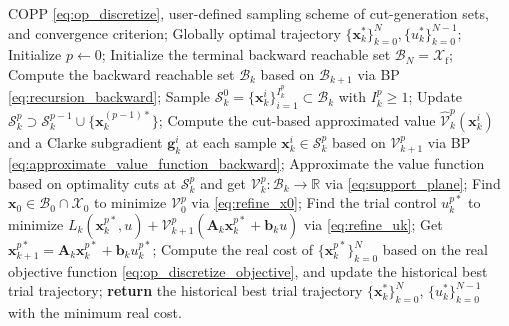 \documentclass[journal]{IEEEtran}
\theoremstyle{definition}
\theoremstyle{definition}
\newcommand\R{{\mathbb{R}}}
\renewcommand\vector[1]{\boldsymbol{#1}}
\newcommand\vb{{\vector{b}}}
\newcommand\vg{{\vector{g}}}
\newcommand\vx{{\vector{x}}}
\newcommand\vA{{\vector{A}}}
\begin{document}
\begin{algorithm}[!t]
    \caption{RDDP for COPP.}
    \label{alg:ardp_copp}
    \begin{algorithmic}[1]
        \REQUIRE COPP \eqref{eq:op_discretize}, user-defined sampling scheme of  cut-generation sets, and convergence criterion;
        \ENSURE Globally optimal trajectory $\{\vx_k^*\}_{k=0}^{N}, \{u_k^*\}_{k=0}^{N-1}$;
        \STATE Initialize $p\leftarrow 0$;
        \STATE Initialize the terminal backward reachable set $\mathcal{B}_N=\mathcal{X}_\text{f}$;
        \REPEAT
                    \STATE Compute the backward reachable set $\mathcal{B}_k$ based on $\mathcal{B}_{k+1}$ via BP \eqref{eq:recursion_backward};
                    \STATE Sample $\mathcal{S}_k^0=\{\vx_k^i\}_{i=1}^{I_k^p}\subset\mathcal{B}_k$ with $I_k^p\geq1$;
                \ELSE
                    \STATE Update $\mathcal{S}_k^p\supset\mathcal{S}_k^{p-1}\cup\Big\{\vx_k^{(p-1)*}\Big\}$;
                \ENDIF
                \STATE Compute the cut-based approximated value $\widehat{\mathcal{V}}_k^p(\vx_k^i)$ and a Clarke subgradient $\vg_k^i$ at each sample $\vx_k^i\in\mathcal{S}_k^p$ based on $\mathcal{V}_{k+1}^p$ via BP \eqref{eq:approximate_value_function_backward};
                \STATE Approximate the value function based on optimality cuts at $\mathcal{S}_k^p$ and get $\mathcal{V}_k^p:\mathcal{B}_k\to\R$ via \eqref{eq:support_plane};
            \ENDFOR
            \STATE Find $\vx_0\in\mathcal{B}_0\cap \mathcal{X}_0$ to minimize $\mathcal{V}_0^p$ via \eqref{eq:refine_x0};
                \STATE Find the trial control $u_k^{p*}$ to minimize $L_k(\vx_k^{p*}, u) + \mathcal{V}_{k+1}^p(\vA_k\vx_k^{p*}+\vb_k u)$ via \eqref{eq:refine_uk};
                \STATE Get $\vx_{k+1}^{p*} = \vA_k\vx_k^{p*}+\vb_k u_k^{p*}$;
            \ENDFOR
            \STATE Compute the real cost of $\{\vx_k^{p*}\}_{k=0}^{N}$ based on the real objective function \eqref{eq:op_discretize_objective}, and update the historical best trial trajectory;
        \STATE \textbf{return} the historical best trial trajectory $\{\vx_k^{*}\}_{k=0}^{N}$, $\{u_k^{*}\}_{k=0}^{N-1}$ with the minimum real cost.
    \end{algorithmic}
\end{algorithm}
\end{document}
